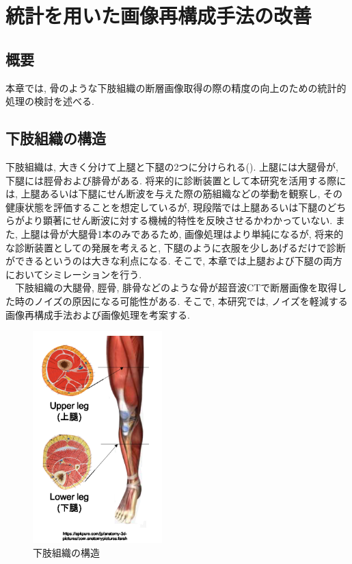 \chapter{統計を用いた画像再構成手法の改善}
\newpage
\section{概要}
本章では, 骨のような下肢組織の断層画像取得の際の精度の向上のための統計的処理の検討を述べる.
\section{下肢組織の構造}
下肢組織は, 大きく分けて上腿と下腿の2つに分けられる(). 上腿には大腿骨が, 下腿には脛骨および腓骨がある. 将来的に診断装置として本研究を活用する際には, 上腿あるいは下腿にせん断波を与えた際の筋組織などの挙動を観察し, その健康状態を評価することを想定しているが, 現段階では上腿あるいは下腿のどちらがより顕著にせん断波に対する機械的特性を反映させるかわかっていない. また, 上腿は骨が大腿骨1本のみであるため, 画像処理はより単純になるが, 将来的な診断装置としての発展を考えると, 下腿のように衣服を少しあげるだけで診断ができるというのは大きな利点になる. そこで, 本章では上腿および下腿の両方においてシミレーションを行う. 
\\\ \ 下肢組織の大腿骨, 脛骨, 腓骨などのような骨が超音波CTで断層画像を取得した時のノイズの原因になる可能性がある. そこで, 本研究では, ノイズを軽減する画像再構成手法および画像処理を考案する. 
\begin{figure}[H]
  \begin{center}
    \includegraphics[width=50mm]{fig/kashisoshiki.pdf}
  \end{center}
  \caption{下肢組織の構造}
\end{figure}
